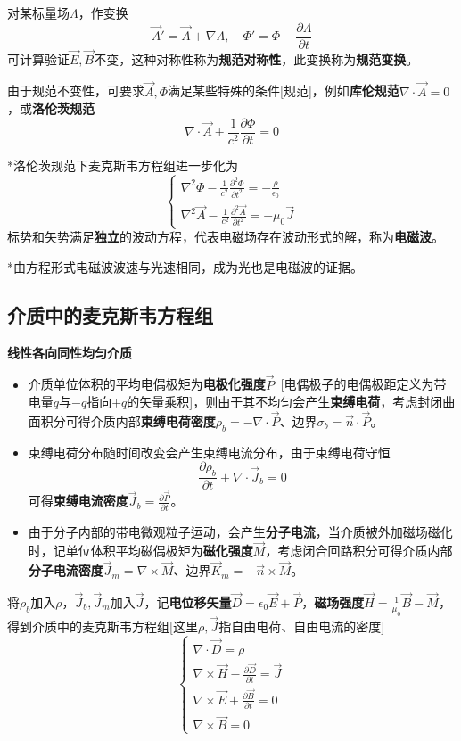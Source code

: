 \documentclass[a4paper,UTF8,fontset=windows]{ctexart}
\newcommand*{\va}{\vec{A}}
\newcommand*{\vb}{\vec{B}}
\newcommand*{\vd}{\vec{D}}
\newcommand*{\ve}{\vec{E}}
\newcommand*{\vh}{\vec{H}}
\newcommand*{\vj}{\vec{J}}
\newcommand*{\vm}{\vec{M}}
\newcommand*{\vp}{\vec{P}}
\newcommand*{\vns}{\vec{n}}
\newcommand*{\pt}[2][t]{\frac{\partial #2}{\partial #1}}
\newcommand*{\ppt}[2][t^2]{\frac{\partial^2 #2}{\partial #1}}
\begin{document}
对某标量场$\Lambda$，作变换
$$\va'=\va+\nabla\Lambda,\quad\Phi'=\Phi-\pt{\Lambda}$$
可计算验证$\ve,\vb$不变，这种对称性称为\textbf{规范对称性}，此变换称为\textbf{规范变换}。

由于规范不变性，可要求$\va,\Phi$满足某些特殊的条件[规范]，例如\textbf{库伦规范}$\nabla\cdot\va=0$，或\textbf{洛伦茨规范}
$$\nabla\cdot\vec{A}+\frac{1}{c^2}\pt{\Phi}=0$$

*洛伦茨规范下麦克斯韦方程组进一步化为
$$\begin{cases}
    \nabla^2\Phi-\frac{1}{c^2}\ppt{\Phi}=-\frac{\rho}{\epsilon_0}\\
    \nabla^2\vec{A}-\frac{1}{c^2}\ppt{\va}=-\mu_0\vj
\end{cases}$$
标势和矢势满足\textbf{独立}的波动方程，代表电磁场存在波动形式的解，称为\textbf{电磁波}。

*由方程形式电磁波波速与光速相同，成为光也是电磁波的证据。

\subsection{介质中的麦克斯韦方程组}
\textbf{线性各向同性均匀介质}

\begin{itemize}
    \item 介质单位体积的平均电偶极矩为\textbf{电极化强度}$\vp$\ [电偶极子的电偶极距定义为带电量$q$与$-q$指向$+q$的矢量乘积]，则由于其不均匀会产生\textbf{束缚电荷}，考虑封闭曲面积分可得介质内部\textbf{束缚电荷密度}$\rho_b=-\nabla\cdot\vp$、边界$\sigma_b=\vns\cdot\vp$。
    \item 束缚电荷分布随时间改变会产生束缚电流分布，由于束缚电荷守恒
    $$\pt{\rho_b}+\nabla\cdot\vj_b=0$$
    可得\textbf{束缚电流密度}$\vj_b=\pt{\vp}$。
    \item 由于分子内部的带电微观粒子运动，会产生\textbf{分子电流}，当介质被外加磁场磁化时，记单位体积平均磁偶极矩为\textbf{磁化强度}$\vm$，考虑闭合回路积分可得介质内部\textbf{分子电流密度}$\vj_m=\nabla\times\vm$、边界$\vec{K}_m=-\vns\times\vm$。
\end{itemize}

将$\rho_b$加入$\rho$，$\vj_b,\vj_m$加入$\vj$，记\textbf{电位移矢量}$\vd=\epsilon_0\ve+\vp$，\textbf{磁场强度}$\vh=\frac{1}{\mu_0}\vb-\vm$，得到介质中的麦克斯韦方程组[这里$\rho,\vj$指自由电荷、自由电流的密度]
$$\begin{cases}
    \nabla\cdot\vd=\rho\\
    \nabla\times\vh-\pt{\vd}=\vj\\
    \nabla\times\ve+\pt{\vb}=0\\
    \nabla\times\vb=0
\end{cases}$$
\end{document}
